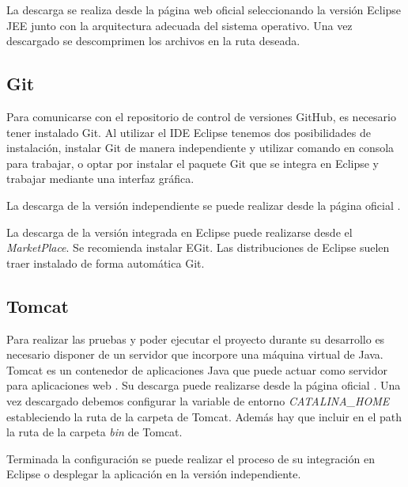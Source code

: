 La descarga se realiza desde la página web oficial \cite{down:ecli} seleccionando la versión Eclipse JEE junto con la arquitectura adecuada del sistema operativo. Una vez descargado se descomprimen los archivos en la ruta deseada.


\subsection{Git}

Para comunicarse con el repositorio de control de versiones GitHub, es necesario tener instalado Git. Al utilizar el IDE Eclipse tenemos dos posibilidades de instalación, instalar Git de manera independiente y utilizar comando en consola para trabajar, o optar por instalar el paquete Git que se integra en Eclipse y trabajar mediante una interfaz gráfica.



La descarga de la versión independiente se puede realizar desde la página oficial \cite{down:git}.

La descarga de la versión integrada en Eclipse puede realizarse desde el \emph{MarketPlace}. Se recomienda instalar EGit. Las distribuciones de Eclipse suelen traer instalado de forma automática Git.


\subsection{Tomcat}

Para realizar las pruebas y poder ejecutar el proyecto durante su desarrollo es necesario disponer de un servidor que incorpore una máquina virtual de Java. Tomcat es un contenedor de aplicaciones Java que puede actuar como servidor para aplicaciones web \cite{wiki:tomc}. Su descarga puede realizarse desde la página oficial \cite{down:tomc}. Una vez descargado debemos configurar la variable de entorno \emph{CATALINA\_HOME} estableciendo la ruta de la carpeta de Tomcat. Además hay que incluir en el path la ruta de la carpeta \emph{bin} de Tomcat.

Terminada la configuración se puede realizar el proceso de su integración en Eclipse o desplegar la aplicación en la versión independiente.


